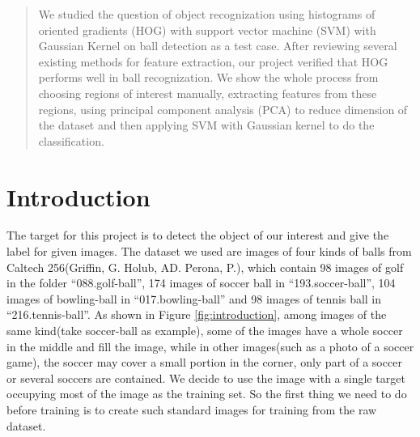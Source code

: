 \documentclass{article}
\begin{document}
 


\begin{abstract} 
We studied the question of object recognization using histograms of oriented gradients (HOG) with support vector machine (SVM) with Gaussian Kernel on ball detection as a test case. After reviewing several existing methods for feature extraction, our project verified that HOG performs well in ball recognization. We show the whole process from choosing regions of interest manually, extracting features from these regions, using principal component analysis (PCA) to reduce dimension of the  dataset and then applying SVM with Gaussian kernel to do the classification.   


\end{abstract}


\section{Introduction}
The target for this project is to detect the object of our interest and give the label for given images. The dataset we used are images of four kinds of balls from Caltech 256(Griffin, G. Holub, AD. Perona, P.), which contain 98 images of golf in the folder ``088.golf-ball'', 174 images of soccer ball in ``193.soccer-ball'', 104 images of bowling-ball in ``017.bowling-ball'' and 98 images of tennis ball in ``216.tennis-ball''. As shown in Figure \ref{fig:introduction}, among images of the same kind(take soccer-ball as example), some of the images have a whole soccer in the middle and fill the image, while in other images(such as a photo of a soccer game), the soccer may cover a small portion in the corner, only part of a soccer or several soccers are contained. We decide to use the image with a single target occupying most of the image as the training set. So the first thing we need to do before training is to create such standard images for training from the raw dataset.
\end{document}
